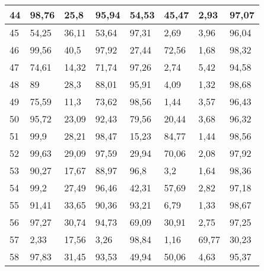 \begin{longtable}[c]{|l|l|l|l|l|l|l|l|}
44              & 98,76        & 25,8         & 95,94       & 54,53         & 45,47         & 2,93          & 97,07         \\ \hline
45              & 54,25        & 36,11        & 53,64       & 97,31         & 2,69          & 3,96          & 96,04         \\ \hline
46              & 99,56        & 40,5         & 97,92       & 27,44         & 72,56         & 1,68          & 98,32         \\ \hline
47              & 74,61        & 14,32        & 71,74       & 97,26         & 2,74          & 5,42          & 94,58         \\ \hline
48              & 89           & 28,3         & 88,01       & 95,91         & 4,09          & 1,32          & 98,68         \\ \hline
49              & 75,59        & 11,3         & 73,62       & 98,56         & 1,44          & 3,57          & 96,43         \\ \hline
50              & 95,72        & 23,09        & 92,43       & 79,56         & 20,44         & 3,68          & 96,32         \\ \hline
51              & 99,9         & 28,21        & 98,47       & 15,23         & 84,77         & 1,44          & 98,56         \\ \hline
52              & 99,63        & 29,09        & 97,59       & 29,94         & 70,06         & 2,08          & 97,92         \\ \hline
53              & 90,27        & 17,67        & 88,97       & 96,8          & 3,2           & 1,64          & 98,36         \\ \hline
54              & 99,2         & 27,49        & 96,46       & 42,31         & 57,69         & 2,82          & 97,18         \\ \hline
55              & 91,41        & 33,65        & 90,36       & 93,21         & 6,79          & 1,33          & 98,67         \\ \hline
56              & 97,27        & 30,74        & 94,73       & 69,09         & 30,91         & 2,75          & 97,25         \\ \hline
57              & 2,33         & 17,56        & 3,26        & 98,84         & 1,16          & 69,77         & 30,23         \\ \hline
58              & 97,83        & 31,45        & 93,53       & 49,94         & 50,06         & 4,63          & 95,37         \\ \hline

\end{longtable}
